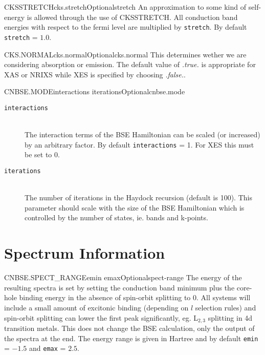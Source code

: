 \documentclass[11pt]{report}
\begin{document}
\begin{Card}{CKSSTRETCH}{cks.stretch}{Optional}{stretch}
An approximation to some kind of self-energy is allowed through the use of CKSSTRETCH. All conduction band energies with respect to the fermi level are multiplied by \texttt{stretch}. By default \texttt{stretch} = $1.0$. 
\end{Card}

\begin{Card}{CKS.NORMAL}{cks.normal}{Optional}{cks.normal}
This determines wether we are considering absorption or emission. The default value of {\it .true.} is appropriate for XAS or NRIXS
while XES is specified by choosing {\it .false.}.
\end{Card}

\begin{Card}{CNBSE.MODE}{interactions iterations}{Optional}{cnbse.mode}
\begin{description}
\item[\texttt{interactions}]\hfill\\ The interaction terms of the BSE Hamiltonian can be scaled (or increased) by an arbitrary factor. By default \texttt{interactions} = 1. For XES this must be set to 0. 
\item[\texttt{iterations}]\hfill\\ The number of iterations in the Haydock recursion (default is 100). This parameter should scale with the size of the BSE Hamiltonian which is controlled by the number of states, ie. bands and k-points.
\end{description}
\end{Card}

\section{Spectrum Information}
\label{sec:Spectrum-Information}

\begin{Card}{CNBSE.SPECT\_RANGE}{emin emax}{Optional}{spect-range}
The energy of the resulting spectra is set by setting the conduction band minimum plus the core-hole binding energy in the absence of spin-orbit splitting to 0. All systems will include a small amount of excitonic binding (depending on $l$ selection rules) and spin-orbit splitting can lower the first peak significantly, eg. L$_{2,3}$ splitting in 4d transition metals. This does not change the BSE calculation, only the output of the spectra at the end. The energy range is given in Hartree and by default \texttt{emin} = $-1.5$ and \texttt{emax} = $2.5$.
\end{Card}
\end{document}
